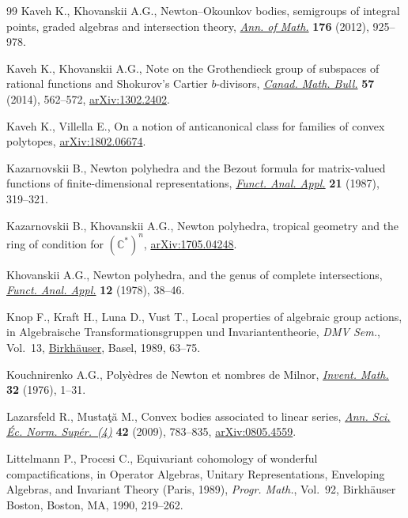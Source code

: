 \documentclass[10pt,a4paper]{amsart}
\numberwithin{equation}{section}
\theoremstyle{definition}
\begin{document}
\begin{thebibliography}{99}
Kaveh K., Khovanskii A.G., Newton--{O}kounkov bodies, semigroups of integral
 points, graded algebras and intersection theory, \href{https://doi.org/10.4007/annals.2012.176.2.5}{\textit{Ann. of Math.}}
 \textbf{176} (2012), 925--978.

Kaveh K., Khovanskii A.G., Note on the {G}rothendieck group of subspaces of
 rational functions and {S}hokurov's {C}artier {$b$}-divisors, \href{https://doi.org/10.4153/CMB-2013-039-6}{\textit{Canad.
 Math. Bull.}} \textbf{57} (2014), 562--572, \href{https://arxiv.org/abs/1302.2402}{arXiv:1302.2402}.

Kaveh K., Villella E., On a notion of anticanonical class for families of
 convex polytopes, \href{https://arxiv.org/abs/1802.06674}{arXiv:1802.06674}.

Kazarnovskii B., Newton polyhedra and the {B}ezout formula for matrix-valued
 functions of finite-dimensional representations, \href{https://doi.org/10.1007/BF01077809}{\textit{Funct. Anal. Appl.}} \textbf{21} (1987), 319--321.

Kazarnovskii B., Khovanskii A.G., Newton polyhedra, tropical geometry and the
 ring of condition for $({\mathbb C}^*)^n$, \href{https://arxiv.org/abs/1705.04248}{arXiv:1705.04248}.

Khovanskii A.G., Newton polyhedra, and the genus of complete intersections,
 \href{https://doi.org/10.1007/BF01077562}{\textit{Funct. Anal. Appl.}} \textbf{12} (1978), 38--46.

Knop F., Kraft H., Luna D., Vust T., Local properties of algebraic group
 actions, in Algebraische {T}ransformationsgruppen und {I}nvariantentheorie,
 \textit{DMV Sem.}, Vol.~13, \href{https://doi.org/10.1007/978-3-0348-7662-9_4}{Birkh\"{a}user}, Basel, 1989, 63--75.

Kouchnirenko A.G., Poly\`edres de {N}ewton et nombres de {M}ilnor,
 \href{https://doi.org/10.1007/BF01389769}{\textit{Invent. Math.}} \textbf{32} (1976), 1--31.

Lazarsfeld R., Musta\c{t}\u{a} M., Convex bodies associated to linear series,
 \href{https://doi.org/10.24033/asens.2109}{\textit{Ann. Sci. \'Ec. Norm. Sup\'er.~(4)}} \textbf{42} (2009), 783--835, \href{https://arxiv.org/abs/0805.4559}{arXiv:0805.4559}.

Littelmann P., Procesi C., Equivariant cohomology of wonderful
 compactifications, in Operator Algebras, Unitary Representations, Enveloping
 Algebras, and Invariant Theory ({P}aris, 1989), \textit{Progr. Math.},
 Vol.~92, Birkh\"{a}user Boston, Boston, MA, 1990, 219--262.


\end{thebibliography}
\end{document}
